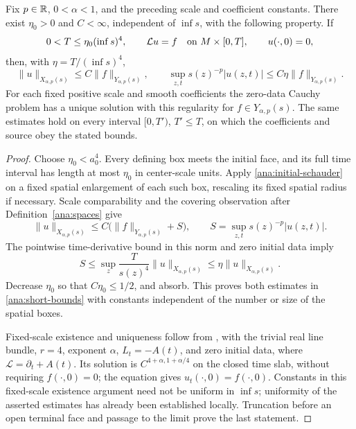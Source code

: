 \begin{lemma}\label{ana:short}
Fix $p\in\mathbb{R}$, $0<\alpha<1$, and the preceding scale and coefficient
constants.  There exist $\eta_0>0$ and $C<\infty$, independent of
$\inf s$, with the following property.  If
\[
 0<T\le\eta_0(\inf s)^4,\qquad
 \mathcal Lu=f\quad\hbox{on }M\times[0,T],\qquad u(\cdot,0)=0,
\]
then, with $\eta=T/(\inf s)^4$,
\begin{equation}\label{ana:short-bounds}
 \|u\|_{X_{\alpha,p}(s)}\le C\|f\|_{Y_{\alpha,p}(s)},\qquad
 \sup_{z,t}s(z)^{-p}|u(z,t)|
                         \le C\eta\|f\|_{Y_{\alpha,p}(s)}.
\end{equation}
For each fixed positive scale and smooth coefficients the zero-data
Cauchy problem has a unique solution with this regularity for
$f\in Y_{\alpha,p}(s)$.  The same estimates hold on every interval
$[0,T')$, $T'\le T$, on which the coefficients and source obey
the stated bounds.
\end{lemma}

\begin{proof}
Choose $\eta_0<a_0^4$.  Every defining box meets the initial
face, and its full time interval has length at most $\eta_0$
in center-scale units.  Apply \eqref{ana:initial-schauder} on a
fixed spatial enlargement of each such box, rescaling its fixed
spatial radius if necessary.  Scale comparability and the covering
observation after Definition~\ref{ana:spaces} give
\[
 \|u\|_{X_{\alpha,p}(s)}
 \le C\bigl(\|f\|_{Y_{\alpha,p}(s)}+S\bigr),\qquad
 S=\sup_{z,t}s(z)^{-p}|u(z,t)|.
\]
The pointwise time-derivative bound in this norm and zero initial
data imply
\[
 S\le\sup_z\frac{T}{s(z)^4}\|u\|_{X_{\alpha,p}(s)}
   \le\eta\|u\|_{X_{\alpha,p}(s)}.
\]
Decrease $\eta_0$ so that $C\eta_0\le1/2$, and absorb.  This
proves both estimates in \eqref{ana:short-bounds} with constants
independent of the number or size of the spatial boxes.

Fixed-scale existence and uniqueness follow from
\cite[Theorem~2.4]{Huang2026}, with the trivial real line bundle,
$r=4$, exponent $\alpha$, $L_t=-A(t)$, and zero initial data,
where $\mathcal L=\partial_t+A(t)$.
Its solution is $C^{4+\alpha,1+\alpha/4}$ on the closed time slab,
without requiring $f(\cdot,0)=0$; the equation gives
$u_t(\cdot,0)=f(\cdot,0)$.
Constants in this fixed-scale existence argument need not be
uniform in $\inf s$; uniformity of the asserted estimates has
already been established locally.  Truncation before an open
terminal face and passage to the limit prove the last statement.
\end{proof}

